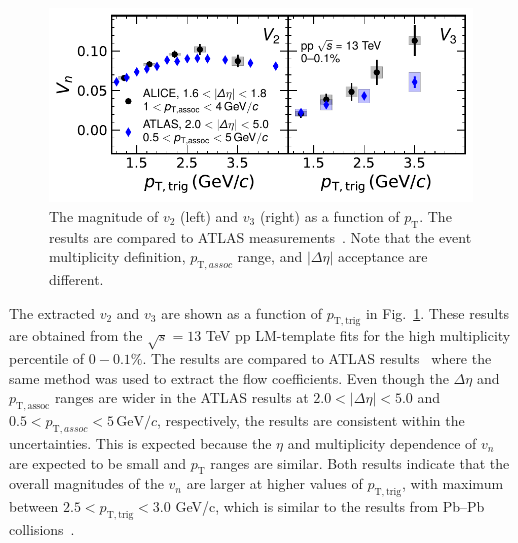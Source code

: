 \begin{figure}[h!]
	\centering
	\includegraphics[width=0.8 \textwidth]{figures/Fig2_vn.pdf} 
	\caption{The magnitude of $v_2$ (left) and $v_3$ (right) as a function of $p_\mathrm{T}$. The results are compared to ATLAS measurements~\cite{Aaboud:2016yar}. Note that the event multiplicity definition, $p_{\mathrm{T},assoc}$ range, and $|\Delta\eta|$ acceptance are different.}
	\label{fig:vn}
\end{figure}

The extracted $v_2$ and $v_3$ are shown as a function of $p_{\mathrm{T},\mathrm{trig}}$ in Fig.~\ref{fig:vn}. These results are obtained from the $\sqrt{s}=13$ TeV pp LM-template fits for the high multiplicity percentile of $0-0.1\%$. The results are compared to ATLAS results~\cite{Aaboud:2016yar} where the same method was used to extract the flow coefficients. Even though the $\Delta\eta$ and $p_{\mathrm{T},\mathrm{assoc}}$ ranges are wider in the ATLAS results at $2.0<|\Delta\eta|<5.0$ and $0.5<p_{\mathrm{T},assoc}<5\,\mathrm{GeV}/c$, respectively, the results are consistent within the uncertainties. This is expected because the $\eta$ and multiplicity dependence of $v_n$ are expected to be small and $p_{\mathrm{T}}$ ranges are similar. Both results indicate that the overall magnitudes of the $v_n$ are larger at higher values of $p_{\mathrm{T},\mathrm{trig}}$, with maximum between $2.5<p_{\mathrm{T},\mathrm{trig}}<3.0$ GeV/c, which is similar to the results from Pb--Pb collisions~\cite{ALICE:2018yph}.

